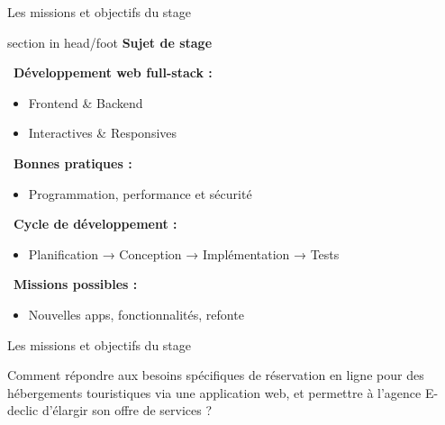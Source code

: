 \documentclass{beamer}
\begin{document}
\begin{frame}{Les missions et objectifs du stage}

	\begin{beamercolorbox}[wd=\paperwidth,ht=1.5em,dp=0.5em,leftskip=0.5cm]{section in head/foot}
  		\large \textbf{Sujet de stage}
	\end{beamercolorbox}
	\vspace{0.2em}
	
	\begin{center}
  		\begin{minipage}{1\textwidth}				

    			\faLaptopCode\ \textbf{Développement web full-stack :}
      		\begin{itemize}
        			\item Frontend \& Backend
        			\item Interactives \& Responsives
      		\end{itemize}

    			\vspace{0.5em}
    			\faCheckCircle\ \textbf{Bonnes pratiques :}
      		\begin{itemize}
        			\item Programmation, performance et sécurité
      		\end{itemize}

    			\vspace{0.5em}
    			\faProjectDiagram\ \textbf{Cycle de développement :}
      		\begin{itemize}
        			\item Planification → Conception → Implémentation → Tests
      		\end{itemize}

    			\vspace{0.5em}
    			\faTasks\ \textbf{Missions possibles :}
      		\begin{itemize}
        			\item Nouvelles apps, fonctionnalités, refonte
      		\end{itemize}
  		\end{minipage}
	\end{center}
	\vfill
\end{frame}

\begin{frame}{Les missions et objectifs du stage}

	Comment répondre aux besoins spécifiques de réservation en ligne pour des hébergements touristiques via une application web, et permettre à l’agence E-declic d’élargir son offre de services ?
			
	\begin{center}
  		\begin{minipage}{0.9\textwidth}
  			\vspace{10cm}
  		\end{minipage}
	\end{center}
	\vfill
\end{frame}
\end{document}
